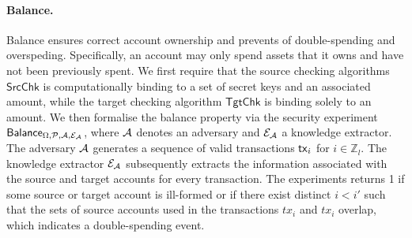 \paragraph*{Balance.} Balance ensures correct account ownership and prevents of double-spending and overspeding. Specifically, an account may only spend assets that it owns and have not been previously spent. We first require that the source checking algorithms $\mathsf{SrcChk}$ is computationally binding to a set of secret keys and an associated amount, while the target checking algorithm $\mathsf{TgtChk}$ is binding solely to an amount. We then formalise the balance property via the security experiment $\mathsf{Balance}_{\Omega,\mathcal{P},\mathcal{A},\mathcal{E}_{\mathcal{A}}}$, where $\mathcal{A}$ denotes an adversary and $\mathcal{E}_{\mathcal{A}}$ a knowledge extractor. The adversary $\mathcal{A}$ generates a sequence of valid transactions $\mathsf{tx}_i$ for $i \in \mathbb{Z}_l$. The knowledge extractor $\mathcal{E}_{\mathcal{A}}$ subsequently extracts the information associated with the source and target accounts for every transaction. The experiments returns 1 if some source or target account is ill-formed or if there exist distinct $i < i'$ such that the sets of source accounts used in the transactions $tx_i$ and $tx_i$ overlap, which indicates a double-spending event.


